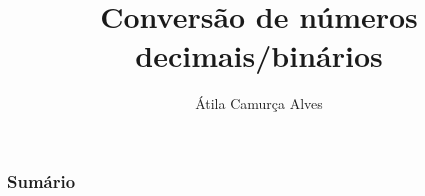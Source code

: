 \documentclass[10pt,mathserif]{beamer}
\title{Conversão de números decimais/binários}
\author{Átila Camurça Alves}
\begin{document}
\begin{frame}
\titlepage
\end{frame}

\begin{frame}\frametitle{Sumário}
\tableofcontents
\end{frame}


\end{document}
